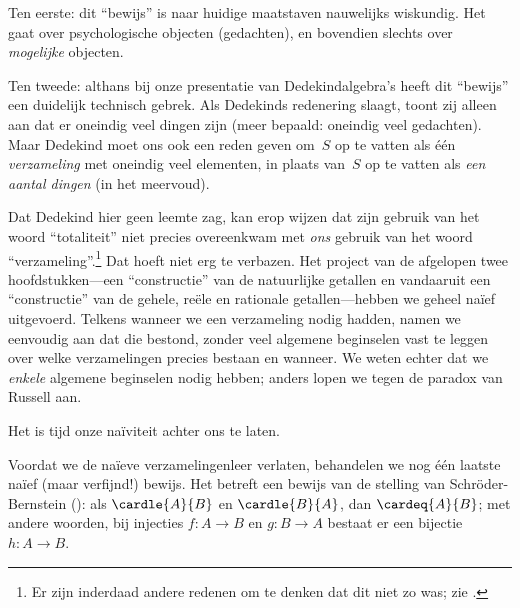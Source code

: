 \documentclass[openany]{memoir}
\begin{document}
Ten eerste: dit ``bewijs'' is naar huidige maatstaven nauwelijks
wiskundig. Het gaat over psychologische objecten (gedachten), en
bovendien slechts over \emph{mogelijke} objecten.

Ten tweede: althans bij onze presentatie van Dedekindalgebra's heeft dit
``bewijs'' een duidelijk technisch gebrek. Als Dedekinds redenering
slaagt, toont zij alleen aan dat er oneindig veel dingen zijn (meer
bepaald: oneindig veel gedachten). Maar Dedekind moet ons ook een reden
geven om~$S$ op te vatten als één \emph{verzameling} met oneindig veel
elementen, in plaats van~$S$ op te vatten als \emph{een aantal
dingen} (in het meervoud).

Dat Dedekind hier geen leemte zag, kan erop wijzen dat zijn gebruik van
het woord ``totaliteit'' niet precies overeenkwam met \emph{ons} gebruik
van het woord ``verzameling''.\footnote{Er zijn inderdaad andere redenen
om te denken dat dit niet zo was; zie \citet[p.~23]{Potter2004}.} Dat
hoeft niet erg te verbazen. Het project van de afgelopen twee
hoofdstukken---een ``constructie'' van de natuurlijke getallen en
vandaaruit een ``constructie'' van de gehele, reële en rationale
getallen---hebben we geheel na\"ief uitgevoerd. Telkens wanneer we een
verzameling nodig hadden, namen we eenvoudig aan dat die bestond, zonder
veel algemene beginselen vast te leggen over welke verzamelingen precies
bestaan en wanneer. We weten echter dat we \emph{enkele} algemene
beginselen nodig hebben; anders lopen we tegen de paradox van Russell
aan.

Het is tijd onze na\"iviteit achter ons te laten.
\endgroup

\begingroup
\def\olfilename{OLP-0054}
\def\olfilepath{content/sets-functions-relations/infinite/}
\hypertarget{unit-OLP-0054}{}


Voordat we de na\"ieve verzamelingenleer verlaten, behandelen we nog één
laatste na\"ief (maar verfijnd!) bewijs. Het betreft een bewijs van de
stelling van Schr\"oder-Bernstein
(): als
$\cardle{A}{B}$ en $\cardle{B}{A}$, dan $\cardeq{A}{B}$; met andere
woorden, bij injecties $f \colon A
\to B$ en $g \colon B \to A$ bestaat er een bijectie $h \colon A
\to B$.
\end{document}
